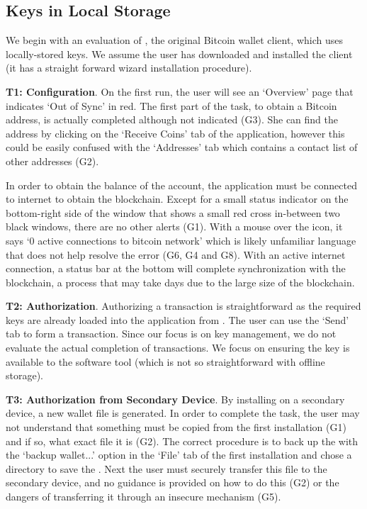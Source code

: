 
\subsection{Keys in Local Storage}
We begin with an evaluation of \bitcoinclient, the original Bitcoin wallet client, which uses locally-stored keys. We assume the user has downloaded and installed the \bitcoinclient client (it has a straight forward wizard installation procedure).

\textbf{T1: Configuration}. 
On the first run, the user will see an `Overview' page that indicates `Out of Sync' in red. The first part of the task, to obtain a Bitcoin address, is actually completed although not indicated (G3). She can find the address by clicking on the `Receive Coins' tab of the application, however this could be easily confused with the `Addresses' tab which contains a contact list of other addresses (G2).

In order to obtain the balance of the account, the application must be connected to internet to obtain the blockchain. Except for a small status indicator on the bottom-right side of the window that shows a small red cross in-between two black windows, there are no other alerts (G1). With a mouse over the icon, it says `0 active connections to bitcoin network' which is likely unfamiliar language that does not help resolve the error (G6, G4 and G8). With an active internet connection, a status bar at the bottom will complete synchronization with the blockchain, a process that may take days due to the large size of the blockchain. 

\textbf{T2: Authorization}.
Authorizing a transaction is straightforward as the required keys are already loaded into the application from \walletfile. The user can use the `Send' tab to form a transaction. Since our focus is on key management, we do not evaluate the actual completion of transactions. We focus on ensuring the key is available to the software tool (which is not so straightforward with \eg offline storage). 

\textbf{T3: Authorization from Secondary Device}.
By installing \bitcoinclient on a secondary device, a new wallet file is generated. In order to complete the task, the user may not understand that something must be copied from the first installation (G1) and if so, what exact file it is (G2). The correct procedure is to back up the \walletfile with the `backup wallet...' option in the `File' tab of the first installation and chose a directory to save the \walletfile. Next the user must securely transfer this file to the secondary device, and no guidance is provided on how to do this (G2) or the dangers of transferring it through an insecure mechanism (G5).

